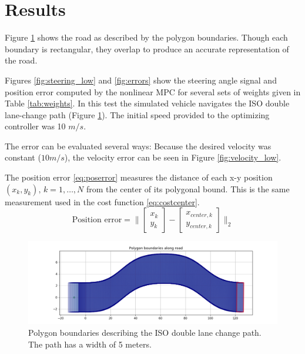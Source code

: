 \documentclass[conference]{IEEEtran}
\begin{document}
\section{Results}
Figure \ref{fig:isolanechange} shows the road as described by the polygon boundaries. Though each boundary is rectangular, they overlap to produce an accurate representation of the road.

Figures \ref{fig:steering_low} and \ref{fig:errors} show the steering angle signal and position error computed by the nonlinear MPC for several sets of weights given in Table \ref{tab:weights}. In this test the simulated vehicle navigates the ISO double lane-change path (Figure \ref{fig:isolanechange}). The initial speed provided to the optimizing controller was 10 $m/s$.

The error can be evaluated several ways: Because the desired velocity was constant ($10 m/s$), the velocity error can be seen in Figure \ref{fig:velocity_low}.

The position error \eqref{eq:poserror} measures the distance of each x-y position $(x_k, y_k),\,k=1,\dots,N$ from the center of its polygonal bound. This is the same measurement used in the cost function \eqref{eq:costcenter}.
\begin{equation}
\text{Position error} = 
\Big\|\begin{bmatrix}x_k\\y_k\end{bmatrix} - \begin{bmatrix}x_{center,k}\\y_{center,k}\end{bmatrix}\Big\|_2
\label{eq:poserror}
\end{equation}

\begin{figure}[htbp]
	\includegraphics[width=1.0\linewidth]{polygon_bounds_iso_lanechange.png}
	\caption{Polygon boundaries describing the ISO double lane change path. The path has a width of 5 meters.}
	\label{fig:isolanechange}
\end{figure}
\end{document}
